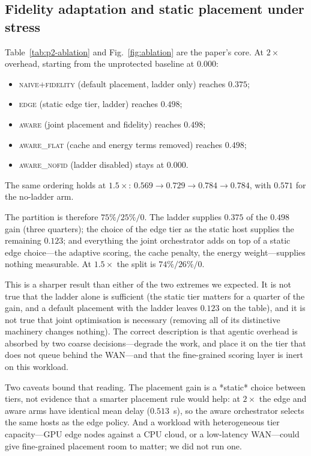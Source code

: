 \documentclass[journal,10pt]{IEEEtran}
\begin{document}
\subsection{Fidelity adaptation and static placement under stress}
\label{sec:ablation}


Table~\ref{tab:p2-ablation} and Fig.~\ref{fig:ablation} are the paper's core.
At $2\times$ overhead, starting from the unprotected baseline at $0.000$:
\begin{itemize}
\item \textsc{naive+fidelity} (default placement, ladder only) reaches $0.375$;
\item \textsc{edge} (static edge tier, ladder) reaches $0.498$;
\item \textsc{aware} (joint placement and fidelity) reaches $0.498$;
\item \textsc{aware\_flat} (cache and energy terms removed) reaches $0.498$;
\item \textsc{aware\_nofid} (ladder disabled) stays at $0.000$.
\end{itemize}
The same ordering holds at $1.5\times$: $0.569\to0.729\to0.784\to0.784$, with
$0.571$ for the no-ladder arm.

The partition is therefore $75\%/25\%/0$. The ladder supplies $0.375$ of the
$0.498$ gain (three quarters); the choice of the edge tier as the static host
supplies the remaining $0.123$; and everything the joint orchestrator adds on
top of a static edge choice---the adaptive scoring, the cache penalty, the energy
weight---supplies nothing measurable. At $1.5\times$ the split is $74\%/26\%/0$.

This is a sharper result than either of the two extremes we expected. It is not
true that the ladder alone is sufficient (the static tier matters for a quarter
of the gain, and a default placement with the ladder leaves $0.123$ on the
table), and it is not true that joint optimisation is necessary (removing all of
its distinctive machinery changes nothing). The correct description is that
agentic overhead is absorbed by two coarse decisions---degrade the work, and
place it on the tier that does not queue behind the WAN---and that the
fine-grained scoring layer is inert on this workload.

Two caveats bound that reading. The placement gain is a *static* choice between
tiers, not evidence that a smarter placement rule would help: at $2\times$ the
edge and aware arms have identical mean delay ($0.513$~s), so the aware
orchestrator selects the same hosts as the edge policy. And a workload with
heterogeneous tier capacity---GPU edge nodes against a CPU cloud, or a
low-latency WAN---could give fine-grained placement room to matter; we did not
run one.
\end{document}
